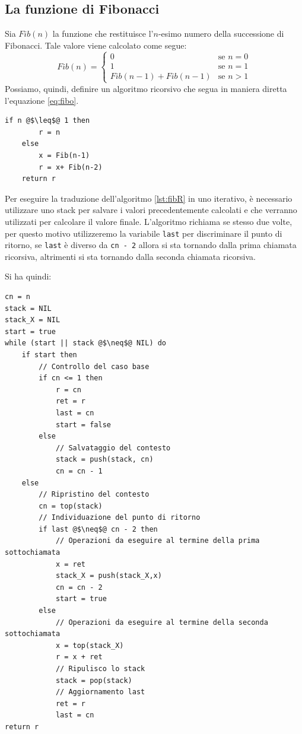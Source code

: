 \subsection{La funzione di Fibonacci}
Sia $Fib(n)$ la funzione che restituisce l'$n$-esimo numero della successione di Fibonacci. Tale valore viene calcolato come segue:
\begin{equation}\label{eq:fibo}
	Fib(n) = \begin{cases}
		0 & \text{se } n =0\\
		1 & \text{se } n = 1\\
		Fib(n-1)+Fib(n-1) & \text{se } n>1
	\end{cases}
\end{equation}
Possiamo, quindi, definire un algoritmo ricorsivo che segua in maniera diretta l'equazione \ref{eq:fibo}.
\begin{lstlisting}[language=asd,caption={\textsc{Fib}(n)},label=lst:fibR]
	if n @$\leq$@ 1 then
		r = n
	else
		x = Fib(n-1)
		r = x+ Fib(n-2)
	return r
\end{lstlisting}

Per eseguire la traduzione dell'algoritmo \ref{lst:fibR} in uno iterativo, è necessario utilizzare uno stack per salvare i valori precedentemente calcolati e che verranno utilizzati per calcolare il valore finale. L'algoritmo richiama se stesso due volte, per questo motivo utilizzeremo la variabile \texttt{last} per discriminare il punto di ritorno, se \texttt{last} è diverso  da \texttt{cn - 2} allora si sta tornando dalla prima chiamata ricorsiva, altrimenti si sta tornando dalla seconda chiamata ricorsiva.

Si ha quindi:
\begin{lstlisting}[language=asd,caption={\textsc{Fib\_Iter}(n)},label=lst:fibI]
cn = n
stack = NIL
stack_X = NIL
start = true
while (start || stack @$\neq$@ NIL) do
	if start then
		// Controllo del caso base
		if cn <= 1 then
			r = cn
			ret = r
			last = cn
			start = false
		else
			// Salvataggio del contesto
			stack = push(stack, cn)
			cn = cn - 1
	else
		// Ripristino del contesto
		cn = top(stack)
		// Individuazione del punto di ritorno
		if last @$\neq$@ cn - 2 then
			// Operazioni da eseguire al termine della prima sottochiamata
			x = ret
			stack_X = push(stack_X,x)
			cn = cn - 2
			start = true
		else
			// Operazioni da eseguire al termine della seconda sottochiamata
			x = top(stack_X)
			r = x + ret
			// Ripulisco lo stack
			stack = pop(stack)
			// Aggiornamento last
			ret = r
			last = cn
return r
\end{lstlisting}
